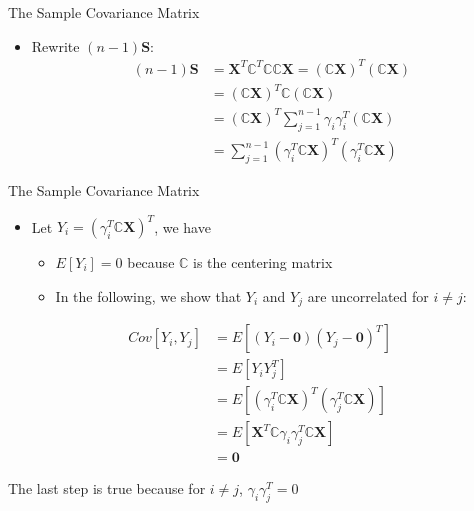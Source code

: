 \documentclass[
  ignorenonframetext,
]{beamer}
\providecommand{\tightlist}{%
  \setlength{\itemsep}{0pt}\setlength{\parskip}{0pt}}
\begin{document}
\begin{frame}{The Sample Covariance Matrix}
\protect\hypertarget{the-sample-covariance-matrix-1}{}
\begin{itemize}
\tightlist
\item
  Rewrite \((n-1)\mathbf S\): \[
  \begin{aligned}
  (n-1)\mathbf S&=\mathbf X^T \mathbb C^T\mathbb C\mathbb C \mathbf X=(\mathbb C \mathbf X)^T(\mathbb C \mathbf X)\\
  &=(\mathbb C \mathbf X)^T\mathbb C(\mathbb C \mathbf X)\\
  &=(\mathbb C \mathbf X)^T\sum_{j=1}^{n-1}\gamma_i \gamma_i^T (\mathbb C \mathbf X)\\
  &=\sum_{j=1}^{n-1} (\gamma_i^T \mathbb C \mathbf X)^T (\gamma_i^T \mathbb C \mathbf X)
  \end{aligned}\]
\end{itemize}
\end{frame}

\begin{frame}{The Sample Covariance Matrix}
\protect\hypertarget{the-sample-covariance-matrix-2}{}
\begin{itemize}
\tightlist
\item
  Let \(Y_i= (\gamma_i^T \mathbb C \mathbf X)^T\), we have

  \begin{itemize}
  \tightlist
  \item
    \(E[Y_i]=0\) because \(\mathbb C\) is the centering matrix
  \item
    In the following, we show that \(Y_i\) and \(Y_j\) are uncorrelated
    for \(i\not=j\):
  \end{itemize}
\end{itemize}

\[\begin{aligned}
  Cov[Y_i, Y_j]&=E[(Y_i-\mathbf 0 )(Y_j-\mathbf 0)^T]\\
  &= E[Y_iY_j^T] \\
  &= E[(\gamma_i^T \mathbb C \mathbf X)^T(\gamma_j^T \mathbb C \mathbf X)]\\
  &= E[\mathbf X^T \mathbb C \gamma_i \gamma_j^T \mathbb C \mathbf X] \\
  &=\mathbf 0
  \end{aligned}\]

The last step is true because for \(i\not=j\), \(\gamma_i \gamma_j^T=0\)
\end{frame}
\end{document}
